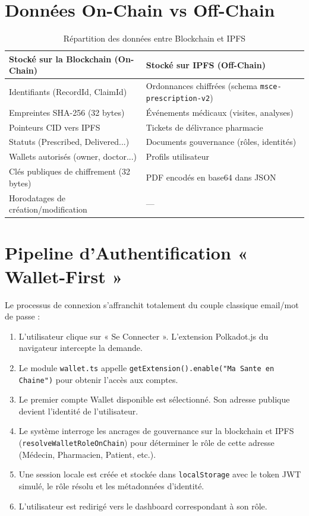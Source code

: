 \documentclass[12pt,a4paper]{report}
\begin{document}
\section{Données On-Chain vs Off-Chain}
\begin{table}[H]
    \centering
    \caption{Répartition des données entre Blockchain et IPFS}
    \label{tab:onchain_offchain}
    \begin{tabular}{|p{6.5cm}|p{6.5cm}|}
        \hline
        \textbf{Stocké sur la Blockchain (On-Chain)} & \textbf{Stocké sur IPFS (Off-Chain)} \\
        \hline
        Identifiants (RecordId, ClaimId) & Ordonnances chiffrées (schema \texttt{msce-prescription-v2}) \\
        \hline
        Empreintes SHA-256 (32 bytes) & Événements médicaux (visites, analyses) \\
        \hline
        Pointeurs CID vers IPFS & Tickets de délivrance pharmacie \\
        \hline
        Statuts (Prescribed, Delivered...) & Documents gouvernance (rôles, identités) \\
        \hline
        Wallets autorisés (owner, doctor...) & Profils utilisateur \\
        \hline
        Clés publiques de chiffrement (32 bytes) & PDF encodés en base64 dans JSON \\
        \hline
        Horodatages de création/modification & --- \\
        \hline
    \end{tabular}
\end{table}

\section{Pipeline d'Authentification « Wallet-First »}
Le processus de connexion s'affranchit totalement du couple classique email/mot de passe :
\begin{enumerate}
    \item L'utilisateur clique sur « Se Connecter ». L'extension Polkadot.js du navigateur intercepte la demande.
    \item Le module \texttt{wallet.ts} appelle \texttt{getExtension().enable("Ma Sante en Chaine")} pour obtenir l'accès aux comptes.
    \item Le premier compte Wallet disponible est sélectionné. Son adresse publique devient l'identité de l'utilisateur.
    \item Le système interroge les ancrages de gouvernance sur la blockchain et IPFS (\texttt{resolveWalletRoleOnChain}) pour déterminer le rôle de cette adresse (Médecin, Pharmacien, Patient, etc.).
    \item Une session locale est créée et stockée dans \texttt{localStorage} avec le token JWT simulé, le rôle résolu et les métadonnées d'identité.
    \item L'utilisateur est redirigé vers le dashboard correspondant à son rôle.
\end{enumerate}
\end{document}
